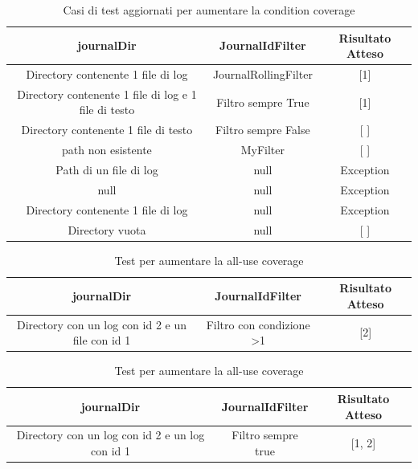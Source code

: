 \documentclass[12pt, a4paper]{article}
\begin{document}
\begin{table}[ht]
  \centering
  \caption[Journal: Test Suite - Adequacy Control Flow 4]{Casi di test aggiornati per aumentare la condition coverage}
  \begin{tabular}{|c|c|c|}
  \hline
  journalDir & JournalIdFilter & Risultato Atteso \\
  \hline
  {Directory contenente 1 file di log} & JournalRollingFilter & [1] \\
  {Directory contenente 1 file di log e 1 file di testo} & Filtro sempre True & [1] \\
  {Directory contenente 1 file di testo} & Filtro sempre False & [ ] \\
  {path non esistente} & MyFilter & [ ] \\
  {Path di un file di log} & null & Exception \\
  null & null & Exception \\
  {Directory contenente 1 file di log} & null & Exception \\
  {Directory vuota} & null & [ ] \\
  \hline
  \end{tabular}
  \label{tab:ACF4ListJournalIds}
\end{table}

  \begin{table}[ht]
    \centering
    \caption[Journal: Test Suite - Adequacy Data Flow 1]{Test per aumentare la all-use coverage}
    \begin{tabular}{|c|c|c|}
      \hline
      journalDir & JournalIdFilter & Risultato Atteso \\
      \hline
      {Directory con un log con id 2 e un file con id 1} & {Filtro con condizione >1} & [2] \\
      \hline
    \end{tabular}
    \label{tab:ADF1ListJournalIds}
  \end{table}

  \begin{table}[ht]
    \centering
    \caption[Journal: Test Suite - Adequacy Data Flow 1]{Test per aumentare la all-use coverage}
    \begin{tabular}{|c|c|c|}
      \hline
      journalDir & JournalIdFilter & Risultato Atteso \\
      \hline
      {Directory con un log con id 2 e un log con id 1} & {Filtro sempre true} & [1, 2] \\
      \hline
    \end{tabular}
    \label{tab:ADF1ListJournalIds}
  \end{table}
\end{document}
